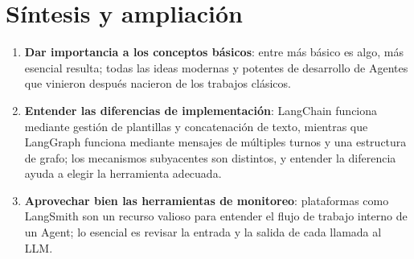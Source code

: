 \section{Síntesis y ampliación}

\begin{enumerate}
    \item \textbf{Dar importancia a los conceptos básicos}: entre más básico es algo, más esencial resulta; todas las ideas modernas y potentes de desarrollo de Agentes que vinieron después nacieron de los trabajos clásicos.
    \item \textbf{Entender las diferencias de implementación}: LangChain funciona mediante gestión de plantillas y concatenación de texto, mientras que LangGraph funciona mediante mensajes de múltiples turnos y una estructura de grafo; los mecanismos subyacentes son distintos, y entender la diferencia ayuda a elegir la herramienta adecuada.
    \item \textbf{Aprovechar bien las herramientas de monitoreo}: plataformas como LangSmith son un recurso valioso para entender el flujo de trabajo interno de un Agent; lo esencial es revisar la entrada y la salida de cada llamada al LLM.
\end{enumerate}


